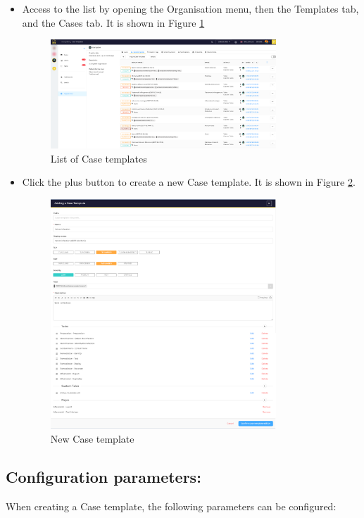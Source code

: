 \documentclass{article}
\begin{document}
\begin{itemize}
\item Access to the list by opening the Organisation menu, then the Templates tab, and the Cases tab. It is shown in Figure \ref{fig:templetes} 

\begin{figure}[h!]
    \centering
    \includegraphics[width=0.8\textwidth]{img21.png}
    \caption{List of Case templates}
    \label{fig:templetes}
\end{figure}

\item Click the plus button to create a new Case template. It is shown in Figure \ref{fig:new}.
\begin{figure}[h!]
    \centering
    \includegraphics[width=0.8\textwidth]{img22.png}
    \caption{New Case template}
    \label{fig:new}
\end{figure}

\end{itemize}


\subsection*{Configuration parameters:}
When creating a Case template, the following parameters can be configured:
\end{document}
